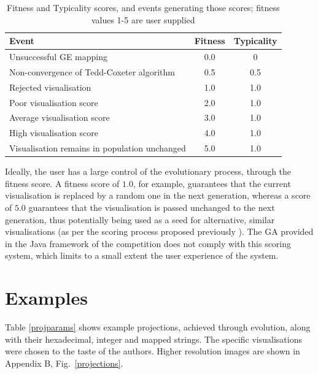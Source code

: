 \documentclass{article}
\begin{document}
\begin{center}
	\begin{table}[th]
	\caption{Fitness and Typicality scores, and events generating those
	scores; fitness values 1-5 are user supplied}
	\begin{tabular}{|l|c|c|}
		\hline
		Event & Fitness & Typicality\\
		\hline
		Unsuccessful GE mapping & 0.0 & 0\\
		\hline
		Non-convergence of Tedd-Coxeter algorithm & 0.5 & 0.5\\
		\hline
		Rejected visualisation & 1.0 & 1.0\\
		\hline
		Poor visualisation score & 2.0 & 1.0\\
		\hline
		Average visualisation score & 3.0 & 1.0\\
		\hline
		High visualisation score & 4.0 & 1.0\\
		\hline
		Visualisation remains in population unchanged & 5.0 & 1.0\\
		\hline
	\end{tabular}
	\label{fittyp}
	\end{table}
\end{center}

Ideally, the user has a large control of the evolutionary process, through the
fitness score. A fitness score of $1.0$, for example, guarantees that the
current visualisation is replaced by a random one in the next generation,
whereas a score of $5.0$ guarantees that the visualisation is passed unchanged
to the next generation, thus potentially being used as a seed for alternative,
similar visualisations (as per the scoring process proposed previously
\cite{nicolau2011a}).
The GA provided in the Java framework of the competition does not comply with
this scoring system, which limits to a small extent the user experience of the
system.

\section{Examples}
\label{examples}

Table  \ref{projparams} shows example projections, achieved through evolution,
along with their hexadecimal, integer and mapped strings. The specific
visualisations were chosen to the taste of the authors. Higher resolution
images are shown in Appendix B, Fig.~\ref{projections}.
\end{document}
